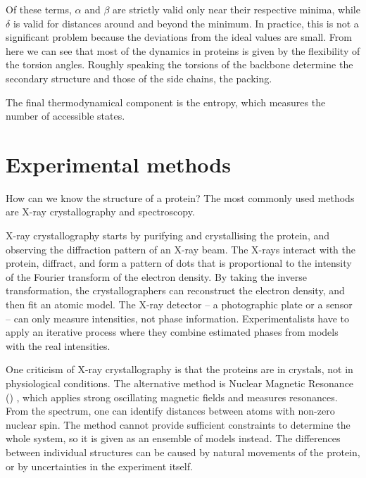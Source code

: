 Of these terms, $\alpha$ and $\beta$ are strictly valid only near their respective minima, while $\delta$ is valid for distances around and beyond the minimum.
In practice, this is not a significant problem because the deviations from the ideal values are small. 
From here we can see that most of the dynamics in proteins is given by the flexibility of the torsion angles.
Roughly speaking the torsions of the backbone determine the secondary structure and those of the side chains, the packing.

The final thermodynamical component is the entropy,  which measures the number of accessible states.


\section{Experimental methods}
How can we know the structure of a protein?
The most commonly used methods are X-ray crystallography and \NMR{} spectroscopy.


X-ray crystallography starts by
purifying and crystallising the protein, and observing the diffraction pattern of an X-ray beam.
The X-rays interact with the protein, diffract, and form a pattern of dots that is proportional to the intensity of the Fourier transform of the electron density.
By taking the inverse transformation, the crystallographers can reconstruct the electron density, and then fit an atomic model.
The X-ray detector -- a photographic plate or a \CCD{} sensor -- can only measure intensities, not phase information.
Experimentalists have to apply an iterative process where they combine estimated phases from models with the real intensities.

One criticism of X-ray crystallography is that the proteins are in crystals, not in physiological conditions.
The alternative method is Nuclear Magnetic Resonance (\NMR) \citep{nmr}, \marginpar{\NMR} which applies strong oscillating magnetic fields and measures resonances.
From the spectrum, one can identify distances between atoms with non-zero nuclear spin.
The method cannot provide sufficient constraints to determine the whole system, so it is given as an ensemble of models instead.
The differences between individual structures can be caused by natural movements of the protein, or by uncertainties in the experiment itself.

